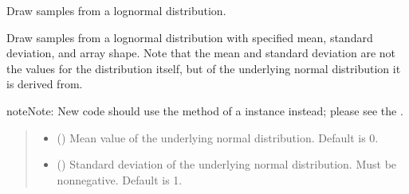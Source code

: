 \documentclass[letterpaper,10pt,english]{sphinxmanual}
\begin{document}

\begin{fulllineitems}
\label{\detokenize{metilda.controllers:metilda.controllers.pitch_art_wizard.lognormal}}
\pysigstartsignatures
{}
\pysigstopsignatures
\sphinxAtStartPar
Draw samples from a log\sphinxhyphen{}normal distribution.

\sphinxAtStartPar
Draw samples from a log\sphinxhyphen{}normal distribution with specified mean,
standard deviation, and array shape.  Note that the mean and standard
deviation are not the values for the distribution itself, but of the
underlying normal distribution it is derived from.

\begin{sphinxadmonition}{note}{Note:}
\sphinxAtStartPar
New code should use the 
method of a  instance instead;
please see the .
\end{sphinxadmonition}
\begin{quote}\begin{description}
\begin{itemize}
\item {} 
\sphinxAtStartPar
{} (\sphinxstyleliteralemphasis{\sphinxupquote{, }}) \textendash{} Mean value of the underlying normal distribution. Default is 0.

\item {} 
\sphinxAtStartPar
{} (\sphinxstyleliteralemphasis{\sphinxupquote{, }}) \textendash{} Standard deviation of the underlying normal distribution. Must be
non\sphinxhyphen{}negative. Default is 1.


\end{itemize}
\end{description}
\end{quote}
\end{fulllineitems}
\end{document}
